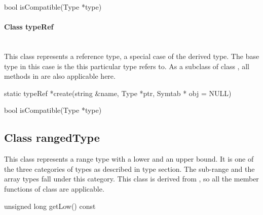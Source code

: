 \begin{apient}
bool isCompatible(Type *type)
\end{apient}

\paragraph{Class typeRef }
\mbox{ }\\

This class represents a reference type, a special case of the derived type. The base type in this case is the  this particular type refers to. As a subclass of class , all methods in  are also applicable here. 


\begin{apient}
static typeRef *create(string &name, Type *ptr, Symtab * obj = NULL)
\end{apient}

\begin{apient}
bool isCompatible(Type *type)
\end{apient}

\subsection{Class rangedType}
This class represents a range type with a lower and an upper bound. It is one of the three categories of types as described in type section. The sub-range and the array types fall under this category. This class is derived from , so all the member functions of class  are applicable.


\begin{apient}
unsigned long getLow() const
\end{apient}

